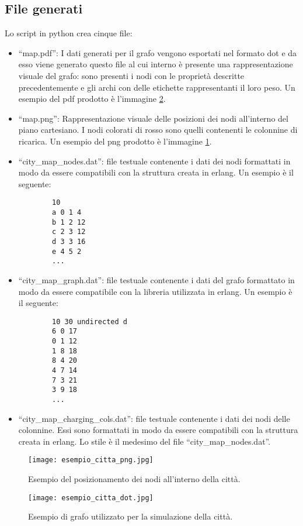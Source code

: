 \subsection{File generati}
Lo script in python crea cinque file:
\begin{itemize}
	\item ``map.pdf'': I dati generati per il grafo vengono esportati nel formato dot e da esso viene generato questo file al cui interno è presente una rappresentazione visuale del grafo: sono presenti i nodi con le proprietà descritte precedentemente e gli archi con delle etichette rappresentanti il loro peso. Un esempio del pdf prodotto è l'immagine \ref{fig:esempio_citta_dot}.
	\item ``map.png'': Rappresentazione visuale delle posizioni dei nodi all'interno del piano cartesiano. I nodi colorati di rosso sono quelli contenenti le colonnine di ricarica. Un esempio del png prodotto è l'immagine \ref{fig:esempio_citta_png}.
	\item ``city\_map\_nodes.dat'': file testuale contenente i dati dei nodi formattati in modo da essere compatibili con la struttura creata in erlang. Un esempio è il seguente:
	\begin{lstlisting}
		10
		a 0 1 4
		b 1 2 12
		c 2 3 12
		d 3 3 16
		e 4 5 2
		...
	\end{lstlisting}
	\item ``city\_map\_graph.dat'': file testuale contenente i dati del grafo formattato in modo da essere compatibile con la libreria utilizzata in erlang. Un esempio è il seguente:
	\begin{lstlisting}
		10 30 undirected d
		6 0 17
		0 1 12
		1 8 18
		8 4 20
		4 7 14
		7 3 21
		3 9 18
		...
	\end{lstlisting}
	\item ``city\_map\_charging\_cols.dat'': file testuale contenente i dati dei nodi delle colonnine. Essi sono formattati in modo da essere compatibili con la struttura creata in erlang. Lo stile è il medesimo del file ``city\_map\_nodes.dat''.
	
\end{itemize}


\begin{figure}[htbp]
	\centering
	\texttt{[image: esempio\_citta\_png.jpg]}
	\caption{Esempio del posizionamento dei nodi all'interno della città.}
	\label{fig:esempio_citta_png}
\end{figure}

\begin{figure}[htbp]
	\centering
	\texttt{[image: esempio\_citta\_dot.jpg]}
	\caption{Esempio di grafo utilizzato per la simulazione della città.}
	\label{fig:esempio_citta_dot}
\end{figure}

